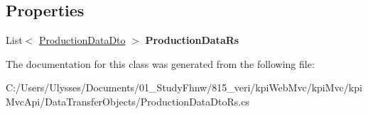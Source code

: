 \subsection*{Properties}
\begin{DoxyCompactItemize}
\item 
\mbox{\label{classkpi_mvc_api_1_1_data_transfer_objects_1_1_production_data_dto_rs_a4f6705f015bff504dffa7567f1df1296}} 
List$<$ \hyperlink{classkpi_mvc_api_1_1_data_transfer_objects_1_1_production_data_dto}{Production\+Data\+Dto} $>$ {\bfseries Production\+Data\+Rs}
\end{DoxyCompactItemize}


The documentation for this class was generated from the following file\+:\begin{DoxyCompactItemize}
\item 
C\+:/\+Users/\+Ulysses/\+Documents/01\+\_\+\+Study\+Fhnw/815\+\_\+veri/kpi\+Web\+Mvc/kpi\+Mvc/kpi\+Mvc\+Api/\+Data\+Transfer\+Objects/Production\+Data\+Dto\+Rs.\+cs\end{DoxyCompactItemize}
